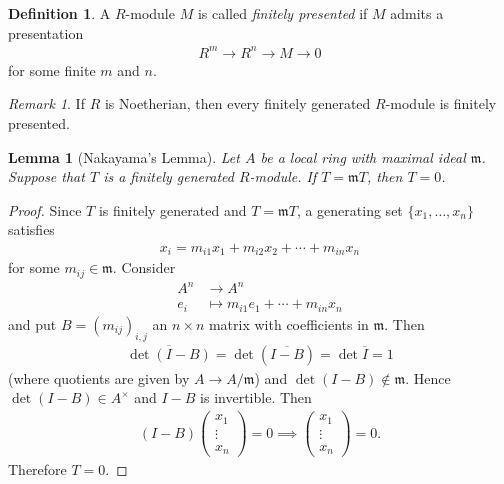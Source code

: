 \documentclass[12pt]{report}
\theoremstyle{plain}
\newtheorem{lemma}[theorem]{Lemma}
\theoremstyle{remark}
\newtheorem*{remark}{Remark}
\theoremstyle{definition}
\newtheorem{definition}[theorem]{Definition}
\begin{document}
\begin{definition}
    A $R$-module $M$ is called \emph{finitely presented} if $M$ admits a presentation
    \begin{align*}
        R^m\to R^n\to M\to 0
    \end{align*}
    for some finite $m$ and $n$.
\end{definition}
\begin{remark}
    If $R$ is Noetherian, then every finitely generated $R$-module is finitely presented.
\end{remark}

\begin{lemma}[Nakayama's Lemma]
    Let $A$ be a local ring with maximal ideal $\mathfrak{m}$. Suppose that $T$ is a finitely generated $R$-module. If $T=\mathfrak{m}T$, then $T=0$.
\end{lemma}
\begin{proof}
    Since $T$ is finitely generated and $T=\mathfrak{m}T$, a generating set $\{x_1,\dots,x_n\}$ satisfies
    \begin{align*}
        x_i=m_{i1}x_1+m_{i2}x_2+\cdots+m_{in}x_n
    \end{align*}
    for some $m_{ij}\in\mathfrak{m}$. Consider
    \begin{align*}
        A^n &\to A^n \\
        e_i &\mapsto m_{i1}e_1+\cdots+m_{in}x_n
    \end{align*}
    and put $B=(m_{ij})_{i,j}$ an $n\times n$ matrix with coefficients in $\mathfrak{m}$. Then
    \begin{align*}
        \overline{\det (I-B)} = \det (\overline{I-B}) = \det \overline{I}=1
    \end{align*}
    (where quotients are given by $A\to A/\mathfrak{m}$) and $\det (I-B)\notin\mathfrak{m}$. Hence $\det(I-B)\in A^\times$ and $I-B$ is invertible. Then
    \begin{align*}
        (I-B) \begin{pmatrix}
            x_1 \\ \vdots \\ x_n
        \end{pmatrix} = 0\implies \begin{pmatrix}
            x_1 \\ \vdots \\ x_n
        \end{pmatrix} = 0.
    \end{align*}
    Therefore $T=0$.
\end{proof}
\end{document}
